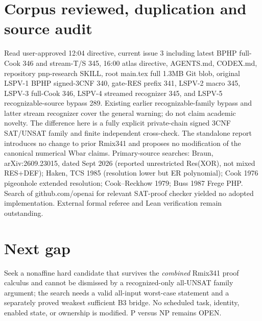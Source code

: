 \documentclass[11pt]{article}
\begin{document}
\section*{Corpus reviewed, duplication and source audit}
Read user-approved 12:04 directive, current issue 3 including latest BPHP full-Cook 346 and stream-T/S 345, 16:00 atlas directive, AGENTS.md, CODEX.md, repository pnp-research SKILL, root main.tex full 1.3MB Git blob, original LSPV-1 BPHP signed-3CNF 340, gate-RES prefix 341, LSPV-2 macro 345, LSPV-3 full-Cook 346, LSPV-4 streamed recognizer 345, and LSPV-5 recognizable-source bypass 289. Existing earlier recognizable-family bypass and latter stream recognizer cover the general warning; do not claim academic novelty. The difference here is a fully explicit private-chain signed 3CNF SAT/UNSAT family and finite independent cross-check. The standalone report introduces no change to prior Rmix341 and proposes no modification of the canonical numerical Wbar claims. Primary-source searches: Braun, arXiv:2609.23015, dated Sept 2026 (reported unrestricted Res(XOR), not mixed RES+DEF); Haken, TCS 1985 (resolution lower but ER polynomial); Cook 1976 pigeonhole extended resolution; Cook--Reckhow 1979; Buss 1987 Frege PHP. Search of github.com/openai for relevant SAT-proof checker yielded no adopted implementation. External formal referee and Lean verification remain outstanding.

\section*{Next gap}
Seek a nonaffine hard candidate that survives the \emph{combined} Rmix341 proof calculus and cannot be dismissed by a recognized-only all-UNSAT family argument; the search needs a valid all-input worst-case statement and a separately proved weakest sufficient B3 bridge. No scheduled task, identity, enabled state, or ownership is modified. P versus NP remains OPEN.
\end{document}
